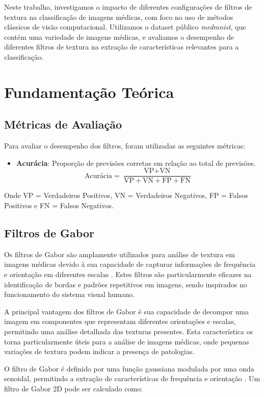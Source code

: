 \documentclass[sigconf,nonacm]{acmart}
\begin{document}
Neste trabalho, investigamos o impacto de diferentes configurações de filtros de textura na classificação de imagens médicas, com foco no uso de métodos clássicos de visão computacional. Utilizamos o dataset público \textit{medmnist}, que contém uma variedade de imagens médicas, e avaliamos o desempenho de diferentes filtros de textura na extração de características relevantes para a classificação.


\section{Fundamentação Teórica}

\subsection{Métricas de Avaliação}
Para avaliar o desempenho dos filtros, foram utilizadas as seguintes métricas:

\begin{itemize}
  \item \textbf{Acurácia}: Proporção de previsões corretas em relação ao total de previsões. 
  \[
  \text{Acurácia} = \frac{\text{VP} + \text{VN}}{\text{VP} + \text{VN} + \text{FP} + \text{FN}}
  \]
\end{itemize}

Onde VP = Verdadeiros Positivos, VN = Verdadeiros Negativos, FP = Falsos Positivos e FN = Falsos Negativos.

\subsection{Filtros de Gabor}

Os filtros de Gabor são amplamente utilizados para análise de textura em imagens médicas devido à sua capacidade de capturar informações de frequência e orientação em diferentes escalas \cite{texture_feature_humeau_2019}. Estes filtros são particularmente eficazes na identificação de bordas e padrões repetitivos em imagens, sendo inspirados no funcionamento do sistema visual humano.

A principal vantagem dos filtros de Gabor é sua capacidade de decompor uma imagem em componentes que representam diferentes orientações e escalas, permitindo uma análise detalhada das texturas presentes. Esta característica os torna particularmente úteis para a análise de imagens médicas, onde pequenas variações de textura podem indicar a presença de patologias.

O filtro de Gabor é definido por uma função gaussiana modulada por uma onda senoidal, permitindo a extração de características de frequência e orientação \cite{texture_feature_humeau_2019}. Um filtro de Gabor 2D pode ser calculado como:
\end{document}
